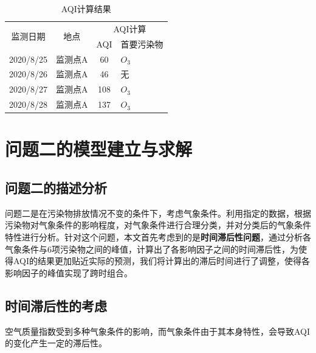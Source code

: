 \documentclass[a4paper,10pt]{my_paper}
\numberwithin{equation}{section}
\begin{document}
\begin{table}[htbp]
    \centering
    \caption{AQI计算结果}\label{tab3}%
      \begin{tabular}{cccp{5em}}
      \toprule
      \multirow{2}[2]{*}{监测日期} & \multirow{2}[2]{*}{地点} & \multicolumn{2}{c}{AQI计算} \\
            &       & \multicolumn{1}{p{4.055em}}{AQI} & 首要污染物 \\
      \midrule
      2020/8/25 & 监测点A  & 60    & ${O_3}$ \\
      2020/8/26 & 监测点A  & 46    & 无 \\
      2020/8/27 & 监测点A  & 108   & ${O_3}$ \\
      2020/8/28 & 监测点A  & 137   & ${O_3}$ \\
      \bottomrule
      \end{tabular}%
  \end{table}%
  


\section{问题二的模型建立与求解}
\subsection{问题二的描述分析}
问题二是在污染物排放情况不变的条件下，考虑气象条件。利用指定的数据，根据污染物对气象条件的影响程度，对气象条件进行合理分类，并对分类后的气象条件特性进行分析。针对这个问题，本文首先考虑到的是\textbf{时间滞后性问题}，通过分析各气象条件与6项污染物之间的峰值，计算出了各影响因子之间的时间滞后性，为使得AQI的结果更加贴近实际的预测，我们将计算出的滞后时间进行了调整，使得各影响因子的峰值实现了跨时组合。

\subsection{时间滞后性的考虑}
空气质量指数受到多种气象条件的影响，而气象条件由于其本身特性，会导致AQI的变化产生一定的滞后性。
\end{document}
